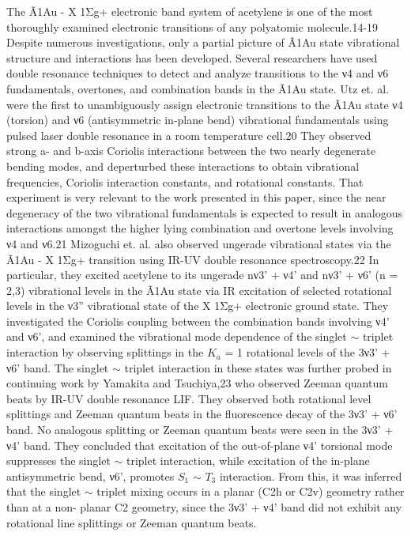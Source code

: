 \documentclass[12pt]{mitthesis}
\begin{document}
The Ã1Au - X 1Σg+ electronic band system of acetylene is one of the
most thoroughly examined electronic transitions of any polyatomic
molecule.14-19 Despite numerous investigations, only a partial picture
of Ã1Au state vibrational structure and interactions has been
developed. Several researchers have used double resonance techniques
to detect and analyze transitions to the ν4 and ν6 fundamentals,
overtones, and combination bands in the Ã1Au state. Utz et. al. were
the first to unambiguously assign electronic transitions to the Ã1Au
state ν4 (torsion) and ν6 (antisymmetric in-plane bend) vibrational
fundamentals using pulsed laser double resonance in a room temperature
cell.20 They observed strong a- and b-axis Coriolis interactions
between the two nearly degenerate bending modes, and deperturbed these
interactions to obtain vibrational frequencies, Coriolis interaction
constants, and rotational constants.  That experiment is very relevant
to the work presented in this paper, since the near degeneracy of the
two vibrational fundamentals is expected to result in analogous
interactions amongst the higher lying combination and overtone levels
involving ν4 and ν6.21 Mizoguchi et. al. also observed ungerade
vibrational states via the Ã1Au - X 1Σg+ transition using IR-UV
double resonance spectroscopy.22 In particular, they excited acetylene
to its ungerade nν3’ + ν4’ and nν3’ + ν6’ (n = 2,3)
vibrational levels in the Ã1Au state via IR excitation of selected
rotational levels in the ν3” vibrational state of the X 1Σg+
electronic ground state.  They investigated the Coriolis coupling
between the combination bands involving ν4’ and ν6’, and examined
the vibrational mode dependence of the singlet $\sim$ triplet interaction
by observing splittings in the $K_a$ = 1 rotational levels of the
3ν3’ + ν6’ band. The singlet $\sim$ triplet interaction in these states
was further probed in continuing work by Yamakita and Tsuchiya,23 who
observed Zeeman quantum beats by IR-UV double resonance LIF. They
observed both rotational level splittings and Zeeman quantum beats in
the fluorescence decay of the 3ν3’ + ν6’ band.  No analogous
splitting or Zeeman quantum beats were seen in the
3ν3’ + ν4’ band. They concluded that excitation of the
out-of-plane ν4’ torsional mode suppresses the singlet $\sim$ triplet
interaction, while excitation of the in-plane antisymmetric bend, ν6’,
promotes $S_1$ $\sim$ $T_3$ interaction. From this, it was inferred that the
singlet $\sim$ triplet mixing occurs in a planar (C2h or C2v) geometry
rather than at a non- planar C2 geometry, since the
3ν3’ + ν4’ band did not exhibit any rotational line splittings or
Zeeman quantum beats.
\end{document}
